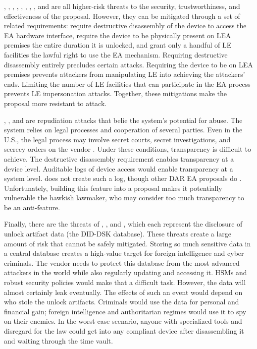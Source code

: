 , , , , , , , , and  are all higher-risk threats to the
security, trustworthiness, and effectiveness of the proposal. However, they can be mitigated through a set of related
requirements: require destructive disassembly of the device to access the \ac{EA} hardware interface, require the device
to be physically present on LEA premises the entire duration it is unlocked, and grant only a handful of LE facilities
the lawful right to use the \ac{EA} mechanism. Requiring destructive disassembly entirely precludes certain attacks.
Requiring the device to be on LEA premises prevents attackers from manipulating LE into achieving the attackers' ends.
Limiting the number of LE facilities that can participate in the \ac{EA} process prevents LE impersonation attacks.
Together, these mitigations make the proposal more resistant to attack.

, , and  are repudiation attacks that belie the system's potential for abuse. The system relies on
legal processes and cooperation of several parties. Even in the U.S., the legal process may involve secret courts,
secret investigations, and secrecy orders on the vendor \cite{shamsi_2011}. Under these conditions, transparency is
difficult to achieve. The destructive disassembly requirement enables transparency at a device level. Auditable logs of
device access  would enable transparency at a system level. \ldawmsr does not create such a
log, though other \ac{DAR} \ac{EA} proposals do \cite{phan_key_2017} \cite{servan_schreiber_jje_2020}
\cite{goldwasser_public_2017}. Unfortunately, building this feature into a proposal makes it potentially vulnerable the
hawkish lawmaker, who may consider too much transparency to be an anti-feature.

Finally, there are the threats of , , and , which each represent the disclosure of unlock artifact
data (the DID-DSK database). These threats create a large amount of risk that cannot be safely mitigated. Storing so
much sensitive data in a central database creates a high-value target for foreign intelligence and cyber criminals. The
vendor needs to protect this database from the most advanced attackers in the world while also regularly updating and
accessing it. \Acp{HSM} and robust security policies would make that a difficult task. However, the data will almost
certainly leak eventually. The effects of such an event would depend on who stole the unlock artifacts. Criminals would
use the data for personal and financial gain; foreign intelligence and authoritarian regimes would use it to spy on
their enemies. In the worst-case scenario, anyone with specialized tools and disregard for the law could get into any
compliant device after disassembling it and waiting through the time vault.

